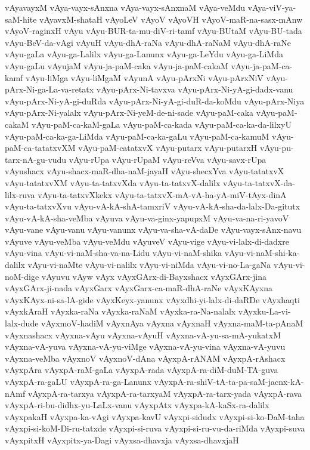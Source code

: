 {vAyavayxM
vAya-vayx-sAnxna
vAya-vayx-sAnxnaM
vAya-veMdu
vAya-viV-ya-saM-hite
vAyavxM-shataH
vAyoLeV
vAyoV
vAyoVH
vAyoV-maR-na-sasx-mAnw
vAyoV-raginxH
vAyu
vAyu-BUR-ta-mu-diV-ri-tamf
vAyu-BUtaM
vAyu-BU-tada
vAyu-BeV-da-vAgi
vAyuH
vAyu-dhA-raNa
vAyu-dhA-raNaM
vAyu-dhA-raNe
vAyu-gaLa
vAyu-ga-Lalilx
vAyu-ga-Lanunx
vAyu-ga-LeYdu
vAyu-ga-LiMda
vAyu-gaLu
vAyujaM
vAyu-ja-paM-caka
vAyu-ja-paM-cakaM
vAyu-ja-paM-ca-kamf
vAyu-liMga
vAyu-liMgaM
vAyunA
vAyu-pArxNi
vAyu-pArxNiV
vAyu-pArx-Ni-ga-La-va-retatx
vAyu-pArx-Ni-tavxva
vAyu-pArx-Ni-yA-gi-dadx-vanu
vAyu-pArx-Ni-yA-gi-duRda
vAyu-pArx-Ni-yA-gi-duR-da-koMdu
vAyu-pArx-Niya
vAyu-pArx-Ni-yalalx
vAyu-pArx-Ni-yeM-de-ni-sade
vAyu-paM-caka
vAyu-paM-cakaM
vAyu-paM-ca-kaM-gaLa
vAyu-paM-ca-kada
vAyu-paM-ca-ka-da-lilxyU
vAyu-paM-ca-ka-ga-LiMda
vAyu-paM-ca-ka-gaLu
vAyu-paM-ca-kamuM
vAyu-paM-ca-tatatxvXM
vAyu-paM-catatxvX
vAyu-putarx
vAyu-putarxH
vAyu-pu-tarx-nA-gu-vudu
vAyu-rUpa
vAyu-rUpaM
vAyu-reVva
vAyu-savx-rUpa
vAyushacx
vAyu-shacx-maR-dha-naM-jayaH
vAyu-shecxYva
vAyu-tatatxvX
vAyu-tatatxvXM
vAyu-ta-tatxvXda
vAyu-ta-tatxvX-dalilx
vAyu-ta-tatxvX-da-lilx-ruva
vAyu-ta-tatxvXkekx
vAyu-ta-tatxvX-mA-vA-ha-yA-miV-tAyx-dinA
vAyu-ta-tatxvXvu
vAyu-vA-kA-shA-tamxriV
vAyu-vA-kA-sha-da-lalx-Da-gitutx
vAyu-vA-kA-sha-veMba
vAyuva
vAyu-va-ginx-yapupxM
vAyu-va-na-ri-yavoV
vAyu-vane
vAyu-vanu
vAyu-vanunx
vAyu-va-sha-vA-daDe
vAyu-vayx-sAnx-navu
vAyuve
vAyu-veMba
vAyu-veMdu
vAyuveV
vAyu-vige
vAyu-vi-lalx-di-dadxre
vAyu-vina
vAyu-vi-naM-sha-va-na-Lidu
vAyu-vi-naM-shika
vAyu-vi-naM-shi-ka-dalilx
vAyu-vi-naMte
vAyu-vi-nalilx
vAyu-vi-niMda
vAyu-vi-no-La-gaNa
vAyu-vi-noM-dige
vAyuvu
vAyw
vAyx
vAyxGArx-di-Bayxshacx
vAyxGArx-jina
vAyxGArx-ji-nada
vAyxGarx
vAyxGarx-ca-maR-dhA-raNe
vAyxKAyxna
vAyxKAyx-ni-sa-lA-gide
vAyxKeyx-yanunx
vAyxdhi-yi-lalx-di-daRDe
vAyxhaqti
vAyxkAraH
vAyxka-raNa
vAyxka-raNaM
vAyxka-ra-Na-nalalx
vAyxku-La-vi-lalx-dude
vAyxmoV-hadiM
vAyxnAya
vAyxna
vAyxnaH
vAyxna-maM-ta-pAnaM
vAyxnashacx
vAyxna-vAyu
vAyxna-vAyuH
vAyxna-vA-yu-sa-mA-yukatxM
vAyxna-vA-yuva
vAyxna-vA-yu-viMge
vAyxna-vA-yu-vina
vAyxna-vA-yuvu
vAyxna-veMba
vAyxnoV
vAyxnoV-dAna
vAyxpA-rANAM
vAyxpA-rAshacx
vAyxpAra
vAyxpA-raM-gaLa
vAyxpA-rada
vAyxpA-ra-diM-duM-TA-guva
vAyxpA-ra-gaLU
vAyxpA-ra-ga-Lanunx
vAyxpA-ra-shiV-tA-ta-pa-saM-jacnx-kA-nAmf
vAyxpA-ra-tarxya
vAyxpA-ra-tarxyaM
vAyxpA-ra-tarx-yada
vAyxpA-rava
vAyxpA-ri-bu-didhx-yu-LaLx-vanu
vAyxpAtx
vAyxpa-kA-kaSx-ra-dalilx
vAyxpakaH
vAyxpa-ka-vAgi
vAyxpa-kavU
vAyxpi-sidudx
vAyxpi-si-ko-DaM-taha
vAyxpi-si-koM-Di-ru-tatxde
vAyxpi-si-ruva
vAyxpi-si-ru-vu-da-riMda
vAyxpi-suva
vAyxpitxH
vAyxpitx-ya-Dagi
vAyxsa-dhavxja
vAyxsa-dhavxjaH
}
